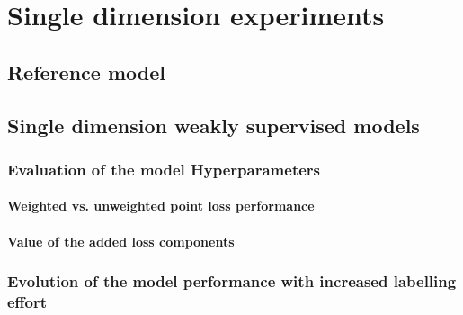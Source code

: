 \chapter{Single dimension experiments}

\section{Reference model}

\section{Single dimension weakly supervised models}

\subsection{Evaluation of the model Hyperparameters}

\subsubsection{Weighted vs. unweighted point loss performance}

\subsubsection{Value of the added loss components}

\subsection{Evolution of the model performance with increased labelling effort}